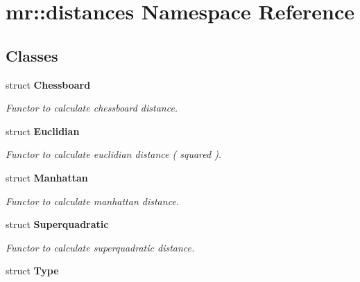 \section{mr::distances Namespace Reference}
\label{namespacemr_1_1distances}


\subsection*{Classes}
\begin{CompactItemize}
\item 
struct {\bf Chessboard}
\begin{CompactList}\small\item\em Functor to calculate chessboard distance. \item\end{CompactList}\item 
struct {\bf Euclidian}
\begin{CompactList}\small\item\em Functor to calculate euclidian distance ( squared ). \item\end{CompactList}\item 
struct {\bf Manhattan}
\begin{CompactList}\small\item\em Functor to calculate manhattan distance. \item\end{CompactList}\item 
struct {\bf Superquadratic}
\begin{CompactList}\small\item\em Functor to calculate superquadratic distance. \item\end{CompactList}\item 
struct {\bf Type}
\end{CompactItemize}
